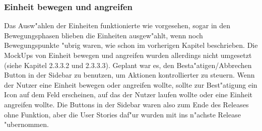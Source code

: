 \documentclass[12pt, titlepage]{scrartcl}
\begin{document}
			\subsubsection{Einheit bewegen und angreifen}
				Das Ausw"ahlen der Einheiten funktionierte wie vorgesehen, sogar in den Bewegungsphasen blieben die Einheiten ausgew"ahlt, wenn noch Bewegungspunkte "ubrig waren, wie schon im vorherigen Kapitel beschrieben. Die MockUps von Einheit bewegen und angreifen wurden allerdings nicht umgesetzt (siehe Kapitel 2.3.3.2 und 2.3.3.3). Geplant war es, den Besta"atigen/Abbrechen Button in der Sidebar zu benutzen, um Aktionen kontrollierter zu steuern. Wenn der Nutzer eine Einheit bewegen oder angreifen wollte, sollte zur Best"atigung ein Icon auf dem Feld erscheinen, auf das der Nutzer laufen wollte oder eine Einheit angreifen wollte. Die Buttons in der Sidebar waren also zum Ende des Releases ohne Funktion, aber die User Stories daf"ur wurden mit ins n"achste Release "ubernommen.
\end{document}
